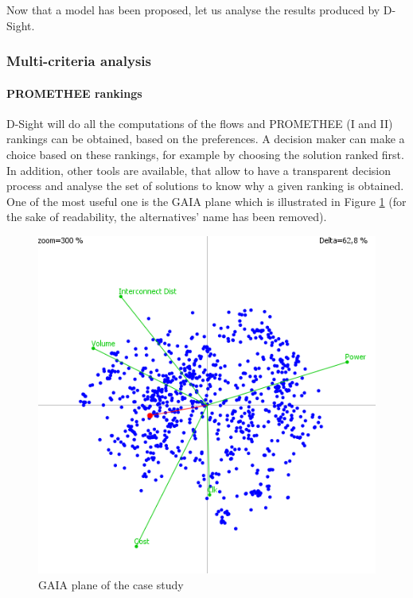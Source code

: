 Now that a model has been proposed, let us analyse the results produced by D-Sight.

\subsubsection{Multi-criteria analysis}

\paragraph{PROMETHEE rankings}
D-Sight will do all the computations of the flows and PROMETHEE (I and II) rankings can be obtained, based on the preferences. A decision maker can make a choice based on these rankings, for example by choosing the solution ranked first. In addition, other tools are available, that allow to have a transparent decision process and analyse the set of solutions to know why a given ranking is obtained. One of the most useful one is the GAIA plane which is illustrated in Figure \ref{fig:gva804} (for the sake of readability, the alternatives' name has been removed).

\begin{figure}[h!]
\begin{center}
\includegraphics[width=0.8\linewidth]{gva804}
\end{center}
\caption{GAIA plane of the case study}
\label{fig:gva804}
\end{figure}

